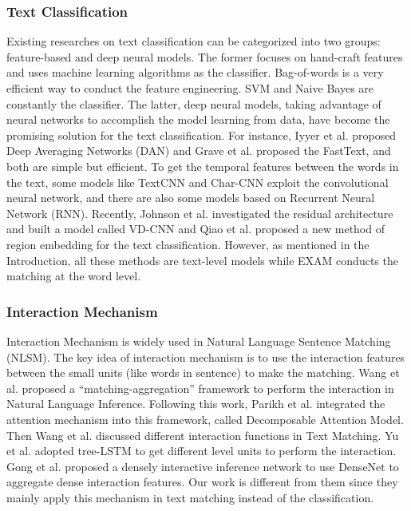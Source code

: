 \documentclass[letterpaper]{article} \usepackage{aaai19}  \usepackage{times}  \usepackage{helvet}  \usepackage{courier}  \usepackage{url}  \usepackage{graphicx}
\begin{document}
\subsubsection{Text Classification}

Existing researches on text classification can be categorized into two groups: feature-based and deep neural models. The former focuses on hand-craft features and uses machine learning algorithms as the classifier. Bag-of-words \cite{bow} is a very efficient way to conduct the feature engineering. SVM and Naive Bayes are constantly the classifier. The latter, deep neural models, taking advantage of neural networks to accomplish the model learning from data, have become the promising solution for the text classification. For instance, Iyyer et al.  proposed Deep Averaging Networks (DAN) and Grave et al.  proposed the FastText, and both are simple but efficient. To get the temporal features between the words in the text, some models like TextCNN \cite{TextCNN} and Char-CNN \cite{charcnn} exploit the convolutional neural network, and there are also some models based on Recurrent Neural Network (RNN). Recently, Johnson et al.  investigated the residual architecture and built a model called VD-CNN and Qiao et al.  proposed a new method of region embedding for the text classification. However, as mentioned in the Introduction, all these methods are text-level models while EXAM conducts the matching at the word level.\subsubsection{Interaction Mechanism}
Interaction Mechanism is widely used in Natural Language Sentence Matching (NLSM). The key idea of interaction mechanism is to use the interaction features between the small units (like words in sentence) to make the matching. Wang et al.  proposed a ``matching-aggregation'' framework to perform the interaction in Natural Language Inference. Following this work, Parikh et al.  integrated the attention mechanism into this framework, called Decomposable Attention Model. Then Wang et al.  discussed different interaction functions in Text Matching. Yu et al.  adopted tree-LSTM to get different level units to perform the interaction. Gong et al.  proposed a densely interactive inference network to use DenseNet to aggregate dense interaction features. Our work is different from them since they mainly apply this mechanism in text matching instead of the classification. 
\end{document}
